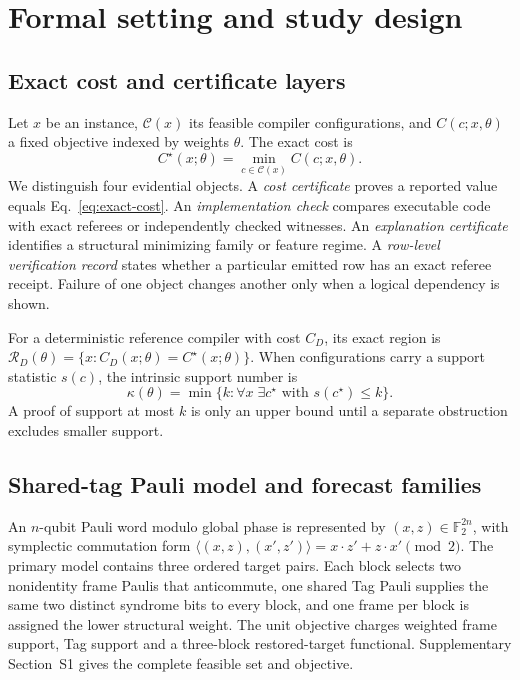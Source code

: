 \section{Formal setting and study design}

\subsection{Exact cost and certificate layers}

Let $x$ be an instance, $\mathcal C(x)$ its feasible compiler configurations, and $C(c;x,\theta)$ a fixed objective indexed by weights $\theta$.  The exact cost is
\begin{equation}
 C^\star(x;\theta)=\min_{c\in\mathcal C(x)} C(c;x,\theta).
 \label{eq:exact-cost}
\end{equation}
We distinguish four evidential objects.  A \emph{cost certificate} proves a reported value equals Eq.~\eqref{eq:exact-cost}.  An \emph{implementation check} compares executable code with exact referees or independently checked witnesses.  An \emph{explanation certificate} identifies a structural minimizing family or feature regime.  A \emph{row-level verification record} states whether a particular emitted row has an exact referee receipt.  Failure of one object changes another only when a logical dependency is shown.

For a deterministic reference compiler with cost $C_D$, its exact region is $\mathcal R_D(\theta)=\{x:C_D(x;\theta)=C^\star(x;\theta)\}$.  When configurations carry a support statistic $s(c)$, the intrinsic support number is
\begin{equation}
 \kappa(\theta)=\min\{k:\forall x\;\exists c^\star\text{ with }s(c^\star)\le k\}.
 \label{eq:kappa}
\end{equation}
A proof of support at most $k$ is only an upper bound until a separate obstruction excludes smaller support.

\subsection{Shared-tag Pauli model and forecast families}

An $n$-qubit Pauli word modulo global phase is represented by $(x,z)\in\mathbb F_2^{2n}$, with symplectic commutation form $\langle(x,z),(x',z')\rangle=x\cdot z'+z\cdot x'\pmod2$.  The primary model contains three ordered target pairs.  Each block selects two nonidentity frame Paulis that anticommute, one shared Tag Pauli supplies the same two distinct syndrome bits to every block, and one frame per block is assigned the lower structural weight.  The unit objective charges weighted frame support, Tag support and a three-block restored-target functional.  Supplementary Section~S1 gives the complete feasible set and objective.

